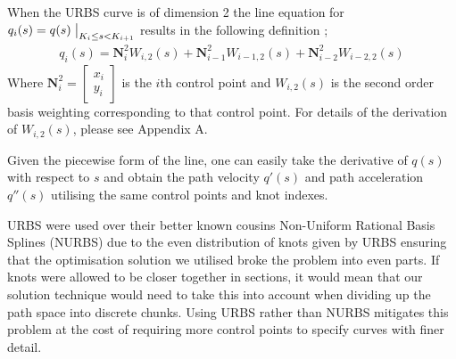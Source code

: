 When the URBS curve is of dimension 2 the line equation for $q_i(s) = q(s)\bigm|_{K_i \leq s < K_{i+1}}$ results in the following definition \cite{website:nurbsExplain};
\begin{align*}
q_i(s) = \textbf{N}_i^2W_{i,2}(s) + \textbf{N}_{i-1}^2W_{i-1,2}(s) + \textbf{N}_{i-2}^2W_{i-2,2}(s)
\end{align*}
Where $\textbf{N}_i^2 = \begin{bmatrix}
x_i\\y_i
\end{bmatrix}$ is the $i$th control point and $W_{i,2}(s)$ is the second order basis weighting corresponding to that control point. 
For details of the derivation of $W_{i,2}(s)$, please see Appendix A.

Given the piecewise form of the line, one can easily take the derivative of $q(s)$ with respect to $s$ and obtain the path velocity $q'(s)$ and path acceleration $q''(s)$ utilising the same control points and knot indexes.
 
URBS were used over their better known cousins Non-Uniform Rational Basis Splines (NURBS) due to the even distribution of knots given by URBS ensuring that the optimisation solution we utilised broke the problem into even parts. If knots were allowed to be closer together in sections, it would mean that our solution technique would need to take this into account when dividing up the path space into discrete chunks. Using URBS rather than NURBS mitigates this problem at the cost of requiring more control points to specify curves with finer detail.